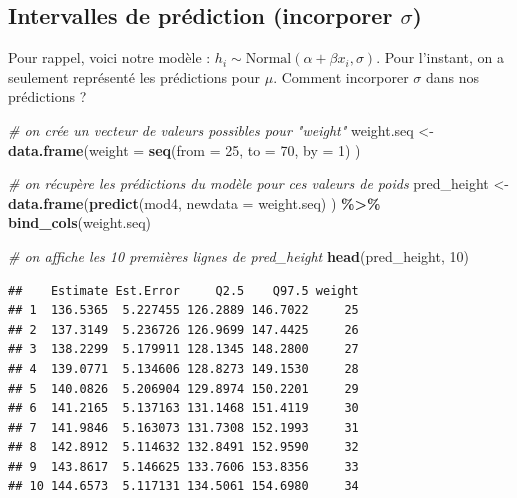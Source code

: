 \documentclass[
  a4paper,11pt,twoside,onecolumn,openright,final,oldfontcommands]{memoir}
\newenvironment{Shaded}{\begin{snugshade}}{\end{snugshade}}
\newcommand{\CommentTok}[1]{\textcolor[rgb]{0.56,0.35,0.01}{\textit{#1}}}
\newcommand{\DataTypeTok}[1]{\textcolor[rgb]{0.13,0.29,0.53}{#1}}
\newcommand{\DecValTok}[1]{\textcolor[rgb]{0.00,0.00,0.81}{#1}}
\newcommand{\KeywordTok}[1]{\textcolor[rgb]{0.13,0.29,0.53}{\textbf{#1}}}
\newcommand{\NormalTok}[1]{#1}
\newcommand{\OperatorTok}[1]{\textcolor[rgb]{0.81,0.36,0.00}{\textbf{#1}}}
\newcommand{\StringTok}[1]{\textcolor[rgb]{0.31,0.60,0.02}{#1}}
\theoremstyle{definition}
\theoremstyle{definition}
\theoremstyle{definition}
\theoremstyle{remark}
\begin{document}
\hypertarget{intervalles-de-pruxe9diction-incorporer-sigma}{%
\subsection{\texorpdfstring{Intervalles de prédiction (incorporer \(\sigma\))}{Intervalles de prédiction (incorporer \textbackslash sigma)}}\label{intervalles-de-pruxe9diction-incorporer-sigma}}

Pour rappel, voici notre modèle : \(h_{i} \sim \mathrm{Normal}(\alpha + \beta x_{i}, \sigma)\). Pour l'instant, on a seulement représenté les prédictions pour \(\mu\). Comment incorporer \(\sigma\) dans nos prédictions ?

\begin{Shaded}
\begin{Highlighting}[]
\CommentTok{\# on crée un vecteur de valeurs possibles pour "weight"}
\NormalTok{weight.seq \textless{}{-}}\StringTok{ }\KeywordTok{data.frame}\NormalTok{(}\DataTypeTok{weight =} \KeywordTok{seq}\NormalTok{(}\DataTypeTok{from =} \DecValTok{25}\NormalTok{, }\DataTypeTok{to =} \DecValTok{70}\NormalTok{, }\DataTypeTok{by =} \DecValTok{1}\NormalTok{) )}

\CommentTok{\# on récupère les prédictions du modèle pour ces valeurs de poids}
\NormalTok{pred\_height \textless{}{-}}\StringTok{ }\KeywordTok{data.frame}\NormalTok{(}\KeywordTok{predict}\NormalTok{(mod4, }\DataTypeTok{newdata =}\NormalTok{ weight.seq) ) }\OperatorTok{\%\textgreater{}\%}\StringTok{ }\KeywordTok{bind\_cols}\NormalTok{(weight.seq)}

\CommentTok{\# on affiche les 10 premières lignes de pred\_height}
\KeywordTok{head}\NormalTok{(pred\_height, }\DecValTok{10}\NormalTok{)}
\end{Highlighting}
\end{Shaded}

\begin{verbatim}
##    Estimate Est.Error     Q2.5    Q97.5 weight
## 1  136.5365  5.227455 126.2889 146.7022     25
## 2  137.3149  5.236726 126.9699 147.4425     26
## 3  138.2299  5.179911 128.1345 148.2800     27
## 4  139.0771  5.134606 128.8273 149.1530     28
## 5  140.0826  5.206904 129.8974 150.2201     29
## 6  141.2165  5.137163 131.1468 151.4119     30
## 7  141.9846  5.163073 131.7308 152.1993     31
## 8  142.8912  5.114632 132.8491 152.9590     32
## 9  143.8617  5.146625 133.7606 153.8356     33
## 10 144.6573  5.117131 134.5061 154.6980     34
\end{verbatim}
\end{document}
